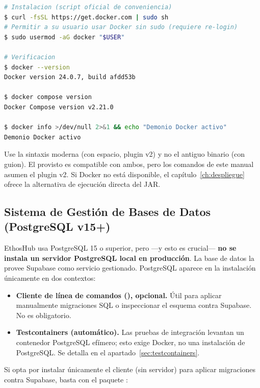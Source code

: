 \begin{lstlisting}[language=bash]
# Instalacion (script oficial de conveniencia)
$ curl -fsSL https://get.docker.com | sudo sh
# Permitir a su usuario usar Docker sin sudo (requiere re-login)
$ sudo usermod -aG docker "$USER"

# Verificacion
$ docker --version
Docker version 24.0.7, build afdd53b

$ docker compose version
Docker Compose version v2.21.0

$ docker info >/dev/null 2>&1 && echo "Demonio Docker activo"
Demonio Docker activo
\end{lstlisting}

\begin{NotaConfiguracion}
Use la sintaxis moderna  (con espacio, plugin v2) y no el antiguo
binario  (con guion). El  provisto es
compatible con ambos, pero los comandos de este manual asumen el plugin v2. Si Docker no
está disponible, el capítulo~\ref{ch:despliegue} ofrece la alternativa de ejecución
directa del JAR.
\end{NotaConfiguracion}

\subsection[Base de Datos (PostgreSQL v15+)]{Sistema de Gestión de Bases de Datos (PostgreSQL v15+)}%
\label{subsec:postgres}

EthosHub usa PostgreSQL 15 o superior, pero —y esto es crucial— \textbf{no se instala un
servidor PostgreSQL local en producción}. La base de datos la provee Supabase como
servicio gestionado. PostgreSQL aparece en la instalación únicamente en dos contextos:\par

\begin{itemize}[noitemsep]
    \item \textbf{Cliente de línea de comandos (), opcional.} Útil para
    aplicar manualmente migraciones SQL o inspeccionar el esquema  contra
    Supabase. No es obligatorio.
    \item \textbf{Testcontainers (automático).} Las pruebas de integración levantan un
    contenedor PostgreSQL efímero; esto exige Docker, no una instalación de PostgreSQL.
    Se detalla en el apartado~\ref{sec:testcontainers}.
\end{itemize}

Si opta por instalar únicamente el cliente  (sin servidor) para aplicar
migraciones contra Supabase, basta con el paquete :\par

